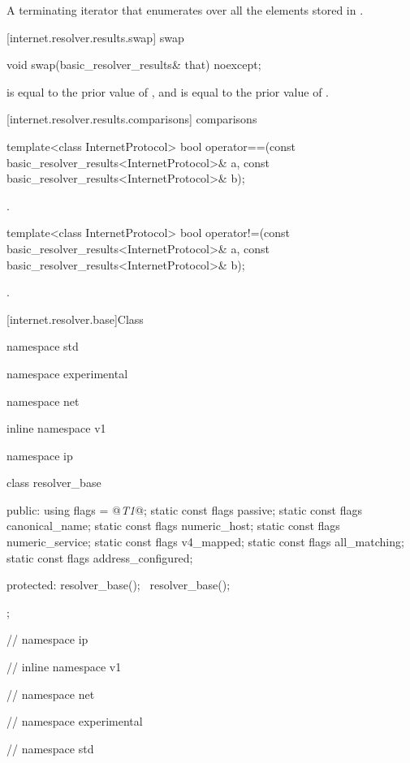 \begin{itemdescr}
\pnum
\returns A terminating iterator that enumerates over all the  elements stored in .
\end{itemdescr}



[internet.resolver.results.swap]{ swap}

\begin{itemdecl}
void swap(basic_resolver_results& that) noexcept;
\end{itemdecl}

\begin{itemdescr}
\pnum
\postconditions {} is equal to the prior value of , and  is equal to the prior value of .
\end{itemdescr}



[internet.resolver.results.comparisons]{ comparisons}

\begin{itemdecl}
template<class InternetProtocol>
  bool operator==(const basic_resolver_results<InternetProtocol>& a,
                  const basic_resolver_results<InternetProtocol>& b);
\end{itemdecl}

\begin{itemdescr}
\pnum
\returns {}.
\end{itemdescr}

\begin{itemdecl}
template<class InternetProtocol>
  bool operator!=(const basic_resolver_results<InternetProtocol>& a,
                  const basic_resolver_results<InternetProtocol>& b);
\end{itemdecl}

\begin{itemdescr}
\pnum
\returns {}.
\end{itemdescr}




%
[internet.resolver.base]{Class }

%
\begin{codeblock}
namespace std {
namespace experimental {
namespace net {
inline namespace v1 {
namespace ip {

  class resolver_base
  {
  public:
    using flags = @\textit{T1}@;
    static const flags passive;
    static const flags canonical_name;
    static const flags numeric_host;
    static const flags numeric_service;
    static const flags v4_mapped;
    static const flags all_matching;
    static const flags address_configured;

  protected:
    resolver_base();
    ~resolver_base();
  };

} // namespace ip
} // inline namespace v1
} // namespace net
} // namespace experimental
} // namespace std
\end{codeblock}

